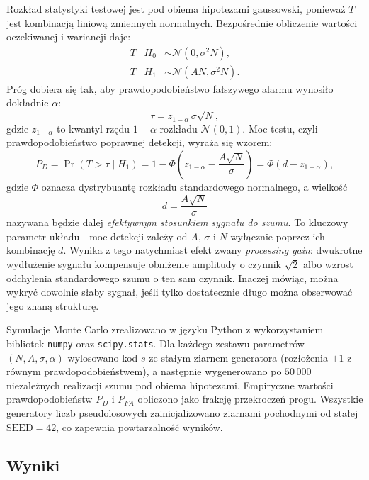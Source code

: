 \documentclass[12pt,a4paper]{article}
\begin{document}
Rozkład statystyki testowej jest pod obiema hipotezami gaussowski, ponieważ $T$ jest kombinacją liniową zmiennych normalnych. Bezpośrednie obliczenie wartości oczekiwanej i wariancji daje:
\begin{align}
    T \mid H_0 &\sim \mathcal{N}(0, \sigma^2 N), \\
    T \mid H_1 &\sim \mathcal{N}(A N, \sigma^2 N).
\end{align}
Próg dobiera się tak, aby prawdopodobieństwo fałszywego alarmu wynosiło dokładnie $\alpha$:
\begin{equation}
    \tau = z_{1-\alpha} \, \sigma \sqrt{N},
\end{equation}
gdzie $z_{1-\alpha}$ to kwantyl rzędu $1-\alpha$ rozkładu $\mathcal{N}(0,1)$. Moc testu, czyli prawdopodobieństwo poprawnej detekcji, wyraża się wzorem:
\begin{equation}
    P_D = \Pr(T > \tau \mid H_1) = 1 - \Phi\!\left(z_{1-\alpha} - \frac{A\sqrt{N}}{\sigma}\right) = \Phi(d - z_{1-\alpha}),
    \label{eq:power}
\end{equation}
gdzie $\Phi$ oznacza dystrybuantę rozkładu standardowego normalnego, a wielkość
\begin{equation}
    d = \frac{A\sqrt{N}}{\sigma}
    \label{eq:d}
\end{equation}
nazywana będzie dalej \emph{efektywnym stosunkiem sygnału do szumu}. To kluczowy parametr układu - moc detekcji zależy od $A$, $\sigma$ i $N$ wyłącznie poprzez ich kombinację $d$. Wynika z tego natychmiast efekt zwany \emph{processing gain}: dwukrotne wydłużenie sygnału kompensuje obniżenie amplitudy o czynnik $\sqrt{2}$ albo wzrost odchylenia standardowego szumu o ten sam czynnik. Inaczej mówiąc, można wykryć dowolnie słaby sygnał, jeśli tylko dostatecznie długo można obserwować jego znaną strukturę.

Symulacje Monte Carlo zrealizowano w języku Python z wykorzystaniem bibliotek \texttt{numpy} oraz \texttt{scipy.stats}. Dla każdego zestawu parametrów $(N, A, \sigma, \alpha)$ wylosowano kod $s$ ze stałym ziarnem generatora (rozłożenia $\pm 1$ z równym prawdopodobieństwem), a następnie wygenerowano po $50\,000$ niezależnych realizacji szumu pod obiema hipotezami. Empiryczne wartości prawdopodobieństw $P_D$ i $P_{FA}$ obliczono jako frakcję przekroczeń progu. Wszystkie generatory liczb pseudolosowych zainicjalizowano ziarnami pochodnymi od stałej $\mathrm{SEED} = 42$, co zapewnia powtarzalność wyników.

\subsection{Wyniki}
\end{document}
